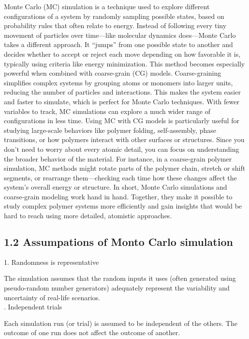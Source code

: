 \documentclass[12pt]{article}
\begin{document}
\begin{flushleft}
Monte Carlo (MC) simulation is a technique used to explore different configurations of a system by randomly sampling possible states, based on probability rules that often relate to energy. Instead of following every tiny movement of particles over time—like molecular dynamics does—Monte Carlo takes a different approach. It “jumps” from one possible state to another and decides whether to accept or reject each move depending on how favorable it is, typically using criteria like energy minimization.
This method becomes especially powerful when combined with coarse-grain (CG) models. Coarse-graining simplifies complex systems by grouping atoms or monomers into larger units, reducing the number of particles and interactions. This makes the system easier and faster to simulate, which is perfect for Monte Carlo techniques. With fewer variables to track, MC simulations can explore a much wider range of configurations in less time.
Using MC with CG models is particularly useful for studying large-scale behaviors like polymer folding, self-assembly, phase transitions, or how polymers interact with other surfaces or structures. Since you don’t need to worry about every atomic detail, you can focus on understanding the broader behavior of the material. For instance, in a coarse-grain polymer simulation, MC methods might rotate parts of the polymer chain, stretch or shift segments, or rearrange them—checking each time how these changes affect the system’s overall energy or structure.
In short, Monte Carlo simulations and coarse-grain modeling work hand in hand. Together, they make it possible to study complex polymer systems more efficiently and gain insights that would be hard to reach using more detailed, atomistic approaches.

\subsection*{1.2 Assumpations of Monto Carlo simulation}


    1. Randomness is representative
    
The simulation assumes that the random inputs it uses (often generated using pseudo-random number generators) adequately represent the variability and uncertainty of real-life scenarios.\\

. Independent trials
    
Each simulation run (or trial) is assumed to be independent of the others. The outcome of one run does not affect the outcome of another.


\end{flushleft}
\end{document}
